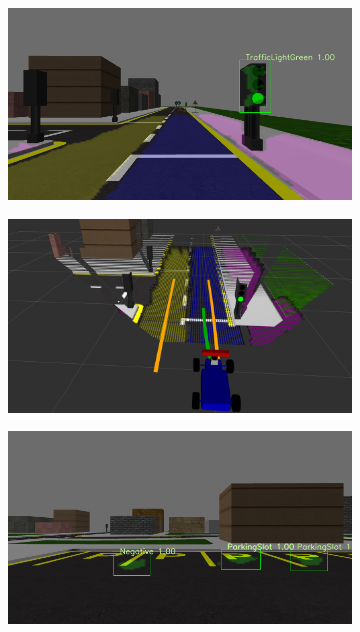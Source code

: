 \begin{figure}[h]
\begin{subfigure}[b]{0.45\linewidth}
  \end{subfigure}
  \begin{subfigure}[b]{0.45\linewidth}
      \includegraphics[width=\linewidth]{figures/experiments/green-light-go-img.png}
  \end{subfigure}
  \begin{subfigure}[b]{0.45\linewidth}
      \includegraphics[width=\linewidth]{figures/experiments/green-light-go-pc.png}
  \end{subfigure}
  \begin{subfigure}[b]{0.45\linewidth}
      \includegraphics[width=\linewidth]{figures/experiments/parking-slot-img.png}

\end{subfigure}
\end{figure}
